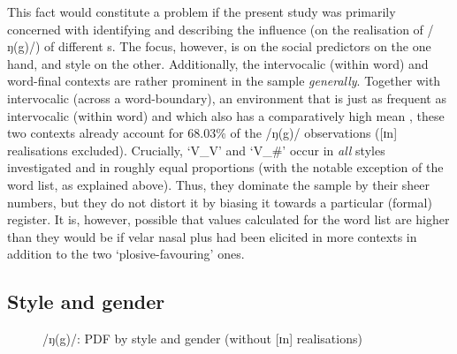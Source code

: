 This fact would constitute a problem if the present study was primarily concerned with identifying and describing the influence (on the realisation of /ŋ(g)/) of different s.
The focus, however, is on the social predictors on the one hand, and style on the other.
Additionally, the intervocalic (within word) and word-final contexts are rather prominent in the sample \emph{generally}.
Together with intervocalic (across a word-boundary), an environment that is just as frequent as intervocalic (within word) and which also has a comparatively high mean , these two contexts  already account for 68.03\% of the /ŋ(g)/ observations ([ɪn] realisations excluded).
Crucially, `V\_V' and `V\_\#' occur in \emph{all} styles investigated and in roughly equal proportions (with the notable exception of the word list, as explained above).
Thus, they dominate the sample by their sheer numbers, but they do not distort it by biasing it towards a particular (formal) register.
It is, however, possible that  values calculated for the word list are higher than they would be if velar nasal plus had been elicited in more contexts in addition to the two `plosive-favouring' ones.

\subsection{Style and gender}
\label{sec.prod.res.con.ng.stylegender}

\begin{figure}[h]
	\centering
		\resizebox{.49\linewidth}{!}{} 
	\caption{/ŋ(g)/: PDF by style and gender (without [ɪn] realisations)}
	\label{fig.box.ng.stylegender}
\end{figure}

